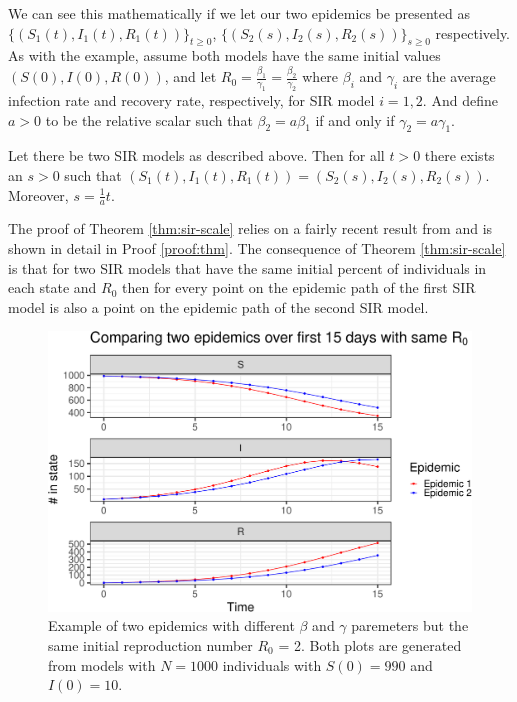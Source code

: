 \documentclass[
  shortnames]{jss}
\begin{document}
We can see this mathematically if we let our two epidemics be presented
as \(\{(S_1(t), I_1(t), R_1(t))\}_{t\geq0}\),
\(\{(S_2(s), I_2(s), R_2(s))\}_{s \geq 0}\) respectively. As with the
example, assume both models have the same initial values
\((S(0), I(0), R(0))\), and let
\(R_0 =\frac{\beta_1}{\gamma_1} = \frac{\beta_2}{\gamma_2}\) where
\(\beta_i\) and \(\gamma_i\) are the average infection rate and recovery
rate, respectively, for SIR model \(i=1, 2\). And define \(a>0\) to be
the relative scalar such that \(\beta_2 = a \beta_1\) if and only if
\(\gamma_2 = a \gamma_1\).

\begin{theorem}\label{thm:sir-scale}
Let there be two SIR models as described above.  Then for all $t > 0$ there exists an $s>0$ such that $(S_1(t), I_1(t), R_1(t)) = (S_2(s), I_2(s), R_2(s))$.  Moreover, $s = \frac{1}{a}t$.
\end{theorem}

The proof of Theorem \ref{thm:sir-scale} relies on a fairly recent
result from \cite{Harko2014} and is shown in detail in Proof
\ref{proof:thm}. The consequence of Theorem \ref{thm:sir-scale} is that
for two SIR models that have the same initial percent of individuals in
each state and \(R_0\) then for every point on the epidemic path of the
first SIR model is also a point on the epidemic path of the second SIR
model.

\begin{CodeChunk}
\begin{figure}[H]

{\centering \includegraphics{Figs/unnamed-chunk-2-1} 

}

\caption{\label{fig:different-scales-standard}Example of two epidemics with different $\beta$ and $\gamma$ paremeters but the same initial reproduction number $R_0$ = 2.  Both plots are generated from models with $N= 1000$ individuals with $S(0) = 990$ and $I(0) = 10$.}\label{fig:unnamed-chunk-2}
\end{figure}
\end{CodeChunk}
\end{document}
